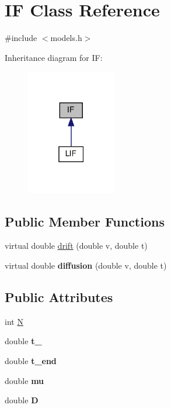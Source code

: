 \hypertarget{classIF}{}\section{IF Class Reference}
\label{classIF}


{\ttfamily \#include $<$models.\+h$>$}



Inheritance diagram for IF\+:\nopagebreak
\begin{figure}[H]
\begin{center}
\leavevmode
\includegraphics[width=111pt]{classIF__inherit__graph}
\end{center}
\end{figure}
\subsection*{Public Member Functions}
\begin{DoxyCompactItemize}
\item 
virtual double \hyperlink{classIF_a9bbd53df68cb9028bf87cf5273253e91}{drift} (double v, double t)
\item 
\mbox{\label{classIF_a45c14ff90b19a93769c2c30741cd482d}} 
virtual double {\bfseries diffusion} (double v, double t)
\end{DoxyCompactItemize}
\subsection*{Public Attributes}
\begin{DoxyCompactItemize}
\item 
int \hyperlink{classIF_aa81bddacf949214f2265214d7174f4c2}{N}
\item 
\mbox{\label{classIF_ab9ff14c2b3690db446567d26cdf21540}} 
double {\bfseries t\+\_}
\item 
\mbox{\label{classIF_a2c512964adfc0421306b655ba3c85d3d}} 
double {\bfseries t\+\_\+end}
\item 
\mbox{\label{classIF_a9f690c993d7b7cd0095e26607503db72}} 
double {\bfseries mu}
\item 
\mbox{\label{classIF_a7e0fdbf32975dba0acf8096524885639}} 
double {\bfseries D}
\end{DoxyCompactItemize}


